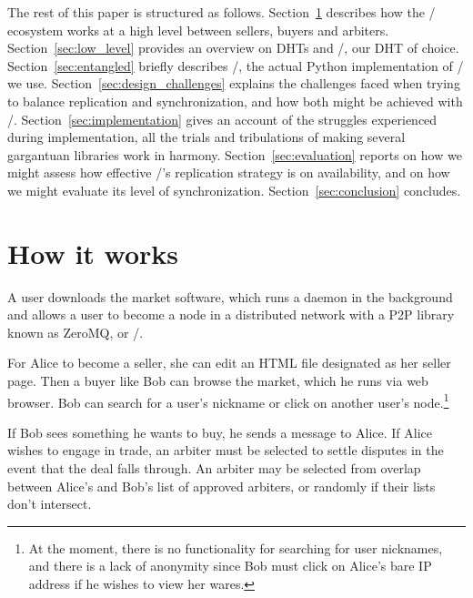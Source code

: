 \documentclass[11pt,twocolumn]{article}
\begin{document}
The rest of this paper is structured as follows.
Section~\ref{sec:high_level} describes how the \OpenBazaar/ ecosystem works at a high level between sellers, buyers and arbiters.
Section~\ref{sec:low_level} provides an overview on DHTs and \Kademlia/, our DHT of choice.
Section~\ref{sec:entangled} briefly describes \Entangled/, the actual Python implementation of \Kademlia/ we use.
Section~\ref{sec:design_challenges} explains the challenges faced when trying to balance replication and synchronization, and how both might be achieved with \Entangled/.
Section~\ref{sec:implementation} gives an account of the struggles experienced during implementation, all the trials and tribulations of making several gargantuan libraries work in harmony.
Section~\ref{sec:evaluation} reports on how we might assess how effective \Entangled/'s replication strategy is on availability, and on how we might evaluate its level of synchronization.
Section~\ref{sec:conclusion} concludes.




\section{How it works}
\label{sec:high_level}
A user downloads the market software, which runs a daemon in the background and allows a user to become a node in a distributed network with a P2P library known as ZeroMQ, or \ZMQ/. 

For Alice to become a seller, she can edit an HTML file designated as her seller page.
Then a buyer like Bob can browse the market, which he runs via web browser.
Bob can search for a user's nickname or click on another user's node.\footnote{At the moment, there is no functionality for searching for user nicknames, and there is a lack of anonymity since Bob must click on Alice's bare IP address if he wishes to view her wares.}

If Bob sees something he wants to buy, he sends a message to Alice.
If Alice wishes to engage in trade, an arbiter must be selected to settle disputes in the event that the deal falls through.
An arbiter may be selected from overlap between Alice's and Bob's list of approved arbiters, or randomly if their lists don't intersect.
\end{document}
